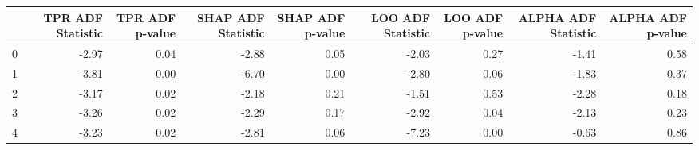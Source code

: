 \begin{tabular}{lrrrrrrrr}
\toprule
 & TPR ADF Statistic & TPR ADF p-value & SHAP ADF Statistic & SHAP ADF p-value & LOO ADF Statistic & LOO ADF p-value & ALPHA ADF Statistic & ALPHA ADF p-value \\
\midrule
0 & -2.97 & 0.04 & -2.88 & 0.05 & -2.03 & 0.27 & -1.41 & 0.58 \\
1 & -3.81 & 0.00 & -6.70 & 0.00 & -2.80 & 0.06 & -1.83 & 0.37 \\
2 & -3.17 & 0.02 & -2.18 & 0.21 & -1.51 & 0.53 & -2.28 & 0.18 \\
3 & -3.26 & 0.02 & -2.29 & 0.17 & -2.92 & 0.04 & -2.13 & 0.23 \\
4 & -3.23 & 0.02 & -2.81 & 0.06 & -7.23 & 0.00 & -0.63 & 0.86 \\
\bottomrule
\end{tabular}
